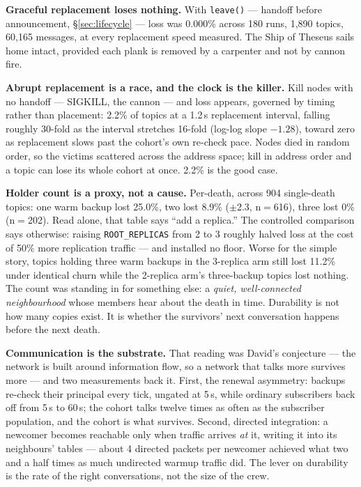 \documentclass[nobib]{tufte-handout}
\begin{document}
\textbf{Graceful replacement loses nothing.} With \texttt{leave()} ---
handoff before announcement, \S\ref{sec:lifecycle} --- loss was 0.000\%
across 180 runs, 1,890 topics, 60,165 messages, at every replacement
speed measured. The Ship of Theseus sails home intact, provided each
plank is removed by a carpenter and not by cannon fire.

\textbf{Abrupt replacement is a race, and the clock is the killer.}
Kill nodes with no handoff --- SIGKILL, the cannon --- and loss appears,
governed by timing rather than placement: 2.2\% of topics at a
1.2\,s replacement interval, falling roughly 30-fold as the interval
stretches 16-fold (log-log slope $-1.28$), toward zero as replacement
slows past the cohort's own re-check pace. Nodes died in random order,
so the victims scattered across the address space; kill in address
order and a topic can lose its whole cohort at once. 2.2\% is the good
case.

\textbf{Holder count is a proxy, not a cause.} Per-death, across 904
single-death topics: one warm backup lost 25.0\%, two lost 8.9\%
($\pm$2.3, n$=$616), three lost 0\% (n$=$202). Read alone, that table
says ``add a replica.'' The controlled comparison says otherwise:
raising \texttt{ROOT\_REPLICAS} from 2 to 3 roughly halved loss at the
cost of 50\% more replication traffic --- and installed no floor.
Worse for the simple story, topics holding three warm backups in the
3-replica arm still lost 11.2\% under identical churn while the
2-replica arm's three-backup topics lost nothing. The count was
standing in for something else: a \emph{quiet, well-connected
neighbourhood} whose members hear about the death in time. Durability
is not how many copies exist. It is whether the survivors' next
conversation happens before the next death.

\textbf{Communication is the substrate.} That reading was David's
conjecture --- the network is built around information flow, so a
network that talks more survives more --- and two measurements back
it. First, the renewal asymmetry: backups re-check their principal
every tick, ungated at 5\,s, while ordinary subscribers back off from
5\,s to 60\,s; the cohort talks twelve times as often as the
subscriber population, and the cohort is what survives. Second,
directed integration: a newcomer becomes reachable only when traffic
arrives \emph{at} it, writing it into its neighbours' tables --- about
4 directed packets per newcomer achieved what two and a half times as
much undirected warmup traffic did. The lever on durability is the
rate of the right conversations, not the size of the crew.
\end{document}
